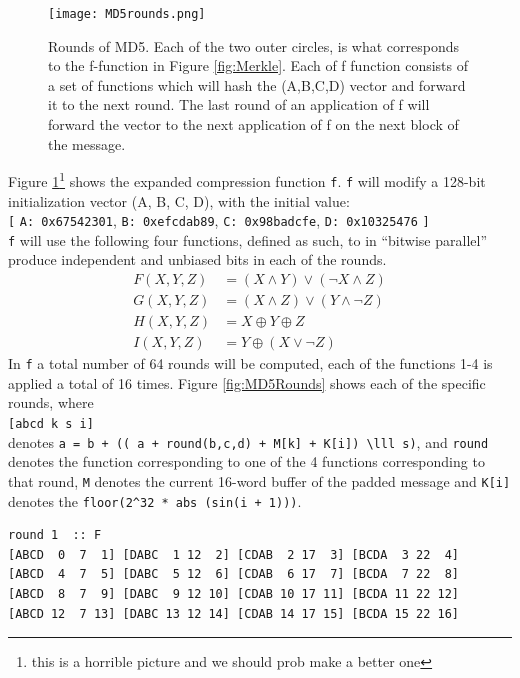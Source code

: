 \documentclass[a4paper, openany]{book}
\begin{document}
\begin{abstact}
\begin{figure}[!htb]
\centering
\texttt{[image: MD5rounds.png]}
\caption[MD5 Rounds]%
{Rounds of MD5. Each of the two outer circles, is what corresponds to the f-function in Figure \ref{fig:Merkle}. Each of f function consists of a set of functions which will hash the (A,B,C,D) vector and forward it to the next round. The last round of an application of f will forward the vector to the next application of f on the next block of the message.}
\label{fig:MD5}
\end{figure}

Figure \ref{fig:MD5}\footnote{this is a horrible picture and we should prob make a better one} shows the expanded compression function \texttt{f}. \texttt{f} will modify a 128-bit initialization vector (A, B, C, D), with the initial value:\\
\texttt{[} \texttt{A: 0x67542301}, \texttt{B: 0xefcdab89}, \texttt{C: 0x98badcfe}, \texttt{D: 0x10325476} \texttt{]}\\
\texttt{f} will use the following four functions, defined as such, to in ``bitwise parallel'' produce independent and unbiased bits in each of the rounds.
\begin{align}
F(X, Y, Z) &= (X \wedge Y) \vee (\neg X \wedge Z) \\
G(X, Y, Z) &= (X \wedge Z) \vee (Y \wedge \neg Z) \\
H(X, Y, Z) &= X \oplus Y \oplus Z \\
I(X, Y, Z) &= Y \oplus ( X \vee \neg Z)
\end{align}
In \texttt{f} a total number of 64 rounds will be computed, each of the functions 1-4 is applied a total of 16 times. Figure \ref{fig:MD5Rounds} shows each of the specific rounds, where\\
\texttt{[abcd k s i]}\\
denotes \texttt{a = b + (( a + round(b,c,d) + M[k] + K[i]) \textbackslash{}lll s)}, and \texttt{round} denotes the function corresponding to one of the 4 functions corresponding to that round, \texttt{M} denotes the current 16-word buffer of the padded message and \texttt{K[i]} denotes the \texttt{floor(2\textasciicircum{}32 * abs (sin(i + 1)))}.
\begin{table}[!htb]
\centering
\begin{verbatim}
round 1  :: F
[ABCD  0  7  1] [DABC  1 12  2] [CDAB  2 17  3] [BCDA  3 22  4]
[ABCD  4  7  5] [DABC  5 12  6] [CDAB  6 17  7] [BCDA  7 22  8]
[ABCD  8  7  9] [DABC  9 12 10] [CDAB 10 17 11] [BCDA 11 22 12]
[ABCD 12  7 13] [DABC 13 12 14] [CDAB 14 17 15] [BCDA 15 22 16]

\end{verbatim}
\end{table}
\end{abstact}
\end{document}
